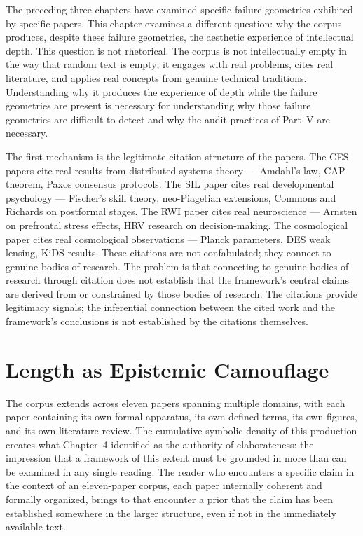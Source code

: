 \documentclass[12pt, openright, twoside]{book}
\begin{document}
The preceding three chapters have examined specific failure geometries exhibited
by specific papers. This chapter examines a different question: why the corpus
produces, despite these failure geometries, the aesthetic experience of
intellectual depth. This question is not rhetorical. The corpus is not
intellectually empty in the way that random text is empty; it engages with
real problems, cites real literature, and applies real concepts from genuine
technical traditions. Understanding why it produces the experience of depth
while the failure geometries are present is necessary for understanding why
those failure geometries are difficult to detect and why the audit practices
of Part~V are necessary.

The first mechanism is the legitimate citation structure of the papers. The
CES papers cite real results from distributed systems theory --- Amdahl's law,
CAP theorem, Paxos consensus protocols. The SIL paper cites real developmental
psychology --- Fischer's skill theory, neo-Piagetian extensions, Commons and
Richards on postformal stages. The RWI paper cites real neuroscience --- Arnsten
on prefrontal stress effects, HRV research on decision-making. The cosmological
paper cites real cosmological observations --- Planck parameters, DES weak
lensing, KiDS results. These citations are not confabulated; they connect to
genuine bodies of research. The problem is that connecting to genuine bodies
of research through citation does not establish that the framework's central
claims are derived from or constrained by those bodies of research. The citations
provide legitimacy signals; the inferential connection between the cited work
and the framework's conclusions is not established by the citations themselves.

\section{Length as Epistemic Camouflage}

The corpus extends across eleven papers spanning multiple domains, with each
paper containing its own formal apparatus, its own defined terms, its own
figures, and its own literature review. The cumulative symbolic density of this
production creates what Chapter~4 identified as the authority of elaborateness:
the impression that a framework of this extent must be grounded in more
than can be examined in any single reading. The reader who encounters a
specific claim in the context of an eleven-paper corpus, each paper internally
coherent and formally organized, brings to that encounter a prior that
the claim has been established somewhere in the larger structure, even if
not in the immediately available text.
\end{document}

